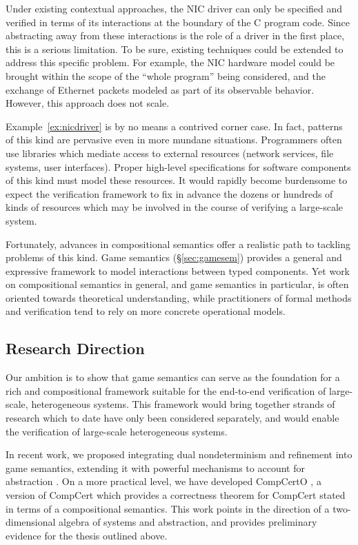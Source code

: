 Under existing contextual approaches, the NIC driver can only be
specified and verified in terms of its interactions at the boundary of
the C program code.  Since abstracting away from these interactions is
the role of a driver in the first place, this is a serious limitation.
To be sure, existing techniques could be extended to address this
specific problem.  For example, the NIC hardware model could be
brought within the scope of the ``whole program'' being considered,
and the exchange of Ethernet packets modeled as part of its observable
behavior.  However, this approach does not scale.

Example~\ref{ex:nicdriver} is by no means a contrived corner case. In
fact, patterns of this kind are pervasive even in more mundane
situations.  Programmers often use libraries which mediate access to
external resources (network services, file systems, user interfaces).
Proper high-level specifications for software components of this kind
must model these resources.  It would rapidly become burdensome to
expect the verification framework to fix in advance the dozens or
hundreds of kinds of resources which may be involved in the course of
verifying a large-scale system.

Fortunately, advances in compositional semantics offer a realistic
path to tackling problems of this kind.
Game semantics
(\S\ref{sec:gamesem}) provides a general and expressive framework to
model interactions between typed components.
Yet work on compositional semantics in general,
and game semantics in particular,
is often oriented towards theoretical understanding,
while practitioners of formal methods and verification
tend to rely on more concrete operational models.

\subsection{Research Direction}

Our ambition is to show that %
game semantics
can serve as the foundation
for a rich and compositional framework
suitable for the end-to-end verification of
large-scale, heterogeneous systems.
This framework would
bring together strands of research
which to date have only been considered separately,
and would enable
the verification of large-scale heterogeneous systems.

In recent work, we proposed
integrating dual nondeterminism and refinement into game semantics,
extending it with powerful mechanisms to account for abstraction
\cite{koenig20,layered22}.
On a more practical level,
we have developed CompCertO \cite{compcerto},
a version of CompCert which
provides a correctness theorem for CompCert
stated in terms of a compositional semantics.
This work points in the direction of a two-dimensional algebra 
of systems and abstraction, and
provides preliminary evidence
for the thesis outlined above.

